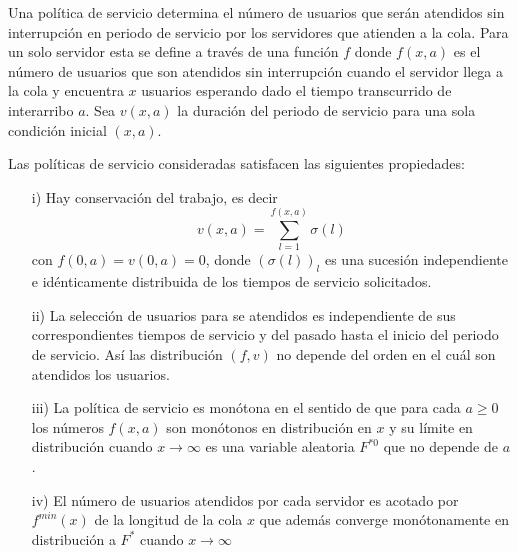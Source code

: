 \documentclass{article}
\numberwithin{equation}{section}
\begin{document}
Una pol\'itica de servicio determina el n\'umero de usuarios que ser\'an
atendidos sin interrupci\'on en periodo de servicio por los
servidores que atienden a la cola. Para un solo servidor esta se
define a trav\'es de una funci\'on $f$ donde $f\left(x,a\right)$ es el
n\'umero de usuarios que son atendidos sin interrupci\'on cuando el
servidor llega a la cola y encuentra $x$ usuarios esperando dado
el tiempo transcurrido de interarribo $a$. Sea $v\left(x,a\right)$
la duraci\'on del periodo de servicio para una sola condici\'on
inicial $\left(x,a\right)$.

Las pol\'iticas de servicio consideradas satisfacen las siguientes
propiedades:

\begin{itemize}
\item[i)] Hay conservaci\'on del trabajo, es decir
\[v\left(x,a\right)=\sum_{l=1}^{f\left(x,a\right)}\sigma\left(l\right)\]
con $f\left(0,a\right)=v\left(0,a\right)=0$, donde
$\left(\sigma\left(l\right)\right)_{l}$ es una sucesi\'on
independiente e id\'enticamente distribuida de los tiempos de
servicio solicitados. \item[ii)] La selecci\'on de usuarios para se
atendidos es independiente de sus correspondientes tiempos de
servicio y del pasado hasta el inicio del periodo de servicio. As\'i
las distribuci\'on $\left(f,v\right)$ no depende del orden en el
cu\'al son atendidos los usuarios. \item[iii)] La pol\'itica de
servicio es mon\'otona en el sentido de que para cada $a\geq0$ los
n\'umeros $f\left(x,a\right)$ son mon\'otonos en distribuci\'on en $x$ y
su l\'imite en distribuci\'on cuando $x\rightarrow\infty$ es una
variable aleatoria $F^{*0}$ que no depende de $a$. \item[iv)] El
n\'umero de usuarios atendidos por cada servidor es acotado por
$f^{min}\left(x\right)$ de la longitud de la cola $x$ que adem\'as
converge mon\'otonamente en distribuci\'on a $F^{*}$ cuando
$x\rightarrow\infty$
\end{itemize}
\end{document}
